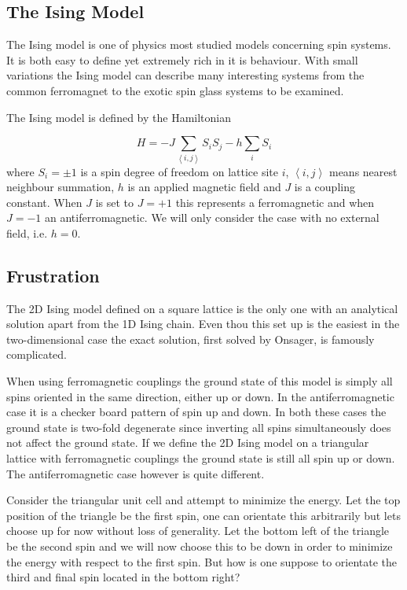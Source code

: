 \documentclass[paper=a4, fontsize=11pt]{scrartcl} %
\numberwithin{equation}{section} %
\numberwithin{figure}{section} %
\numberwithin{table}{section} %
\begin{document}
\subsection{The Ising Model}

The Ising model is one of physics most studied models concerning spin systems. It is both easy to define yet extremely rich in it is behaviour. With small variations the Ising model can describe many interesting systems from the common ferromagnet to the exotic spin glass systems to be examined.

The Ising model is defined by the Hamiltonian

\begin{equation}
H = -J \sum\limits_{\left\langle i,j \right\rangle} S_{i} S_{j} -h \sum\limits_{i} S_{i}
\end{equation}
where $S_{i} = \pm 1$ is a spin degree of freedom on lattice site $i$, $\left< i,j \right> $ means nearest neighbour summation, $h$ is an applied magnetic field and $J$ is a coupling
constant. When $J$ is set to $J=+1$ this represents a ferromagnetic and when $J=-1$ an antiferromagnetic. We will only consider the case with no external field, i.e. $h=0$.

\subsection{Frustration}
The 2D Ising model defined on a square lattice is the only one with an analytical solution apart from the 1D Ising chain. Even thou this set up is the easiest in the two-dimensional case the exact solution, first solved by Onsager, is famously complicated\cite{onsager}. 

When using ferromagnetic couplings the ground state of this model is simply all spins oriented in the same direction, either up or down. In the antiferromagnetic case it is a checker board pattern of spin up and down. In both these cases the ground state is  two-fold degenerate since inverting all spins simultaneously does not affect the ground state. If we define the 2D Ising model on a triangular lattice with ferromagnetic couplings the ground state is still all spin up or down. The antiferromagnetic case however is quite different.

Consider the triangular unit cell and attempt to minimize the energy. Let the top position of the triangle be the first spin, one can orientate this arbitrarily but lets choose up for now without loss of generality. Let the bottom left of the triangle be the second spin and we will now choose this to be down in order to minimize the energy with respect to the first spin. But how is one suppose to orientate the third and final spin located in the bottom right? 
\end{document}
